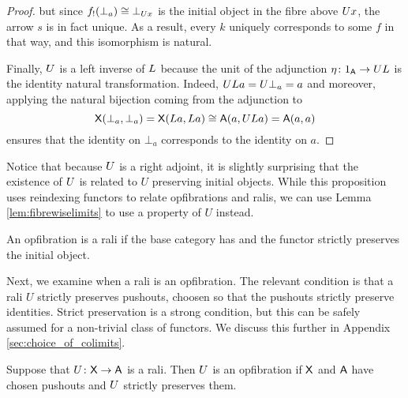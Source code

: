 \documentclass{amsart}
\begin{document}
\begin{proof}
%
%
but since $f_!(\bot_a)\cong\bot_{U x}$ is the initial object in the fibre above $U x$, the arrow $s$ is in fact unique. As a result, every $k$ uniquely corresponds to some $f$ in that way, and this isomorphism is natural.

Finally, $U$ is a left inverse of $L$ because the unit of the adjunction $\eta\colon 1_{\mathsf{A}} \to UL$ is the identity natural transformation. Indeed, $UL a=U\bot_a=a$ and moreover, applying the natural bijection coming from the adjunction to \[\mathsf{X} (\bot_a,\bot_a)=\mathsf{X} (L a,L a)\cong\mathsf{A}(a,UL a)=\mathsf{A} (a,a)\] ensures that the identity on $\bot_a$ corresponds to the identity on $a$.
\end{proof}

Notice that because $U$ is a right adjoint, it is slightly surprising that the existence of $U$ is related to $U$ preserving initial objects. While this proposition uses reindexing functors to relate opfibrations and ralis, we can use Lemma \ref{lem:fibrewiselimits} to use a property of $U$ instead.

\begin{cor}
  An opfibration is a rali if the base category has and the functor strictly preserves the initial object.
\end{cor}

Next, we examine when a rali is an opfibration. The relevant condition is that a rali $U$ strictly preserves pushouts, choosen so that the pushouts strictly preserve identities. Strict preservation is a strong condition, but this can be safely assumed for a non-trivial class of functors.  We discuss this further in Appendix \ref{sec:choice_of_colimits}.

\begin{prop}\label{prop:laritoopfib}
  Suppose that $U\colon\mathsf{X}\to\mathsf{A}$ is a rali. Then $U$ is an opfibration if $\mathsf{X}$ and $\mathsf{A}$ have chosen pushouts and $U$ strictly preserves them.
\end{prop}
\end{document}
